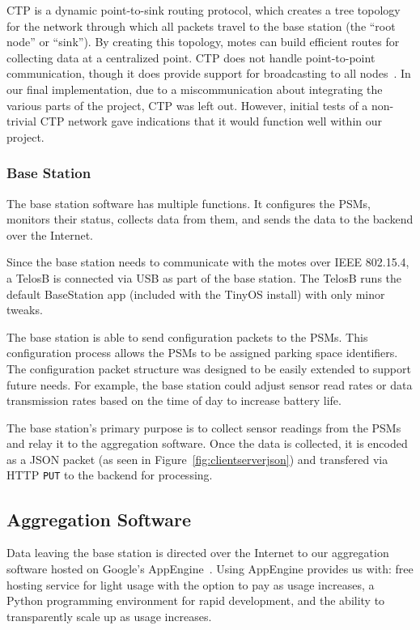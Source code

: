 \documentclass{acm_proc}
\begin{document}
CTP is a dynamic point-to-sink routing protocol, which creates a tree
topology for the network through which all packets travel to the base
station (the ``root node'' or ``sink'').
By creating this topology, motes can build efficient routes for collecting
data at a centralized point.
CTP does not handle point-to-point communication, though it does provide
support for broadcasting to all
nodes~\cite{tep123:collection-tree-protocol}.
In our final implementation, due to a miscommunication about integrating
the various parts of the project, CTP was left out.
However, initial tests of a non-trivial CTP network gave indications that
it would function well within our project.

\subsubsection{Base Station}

The base station software has multiple functions.
It configures the PSMs, monitors their status, collects data from them, and
sends the data to the backend over the Internet.

Since the base station needs to communicate with the motes over IEEE
802.15.4, a TelosB is connected via USB as part of the base station.
The TelosB runs the default BaseStation app (included with the TinyOS
install) with only minor tweaks.

The base station is able to send configuration packets to the PSMs.
This configuration process allows the PSMs to be assigned parking space
identifiers.
The configuration packet structure was designed to be easily extended to
support future needs.
For example, the base station could adjust sensor read rates or data
transmission rates based on the time of day to increase battery life.

The base station's primary purpose is to collect sensor readings from the
PSMs and relay it to the aggregation software.
Once the data is collected, it is encoded as a JSON packet (as seen in
Figure~\ref{fig:clientserverjson}) and transfered via HTTP \texttt{PUT} to
the backend for processing.

\subsection{Aggregation Software}

Data leaving the base station is directed over the Internet to our
aggregation software hosted on Google's AppEngine~\cite{google:appengine}.
Using AppEngine provides us with: free hosting service for light usage
with the option to pay as usage increases, a Python programming environment
for rapid development, and the ability to transparently scale up as usage
increases.
\end{document}
